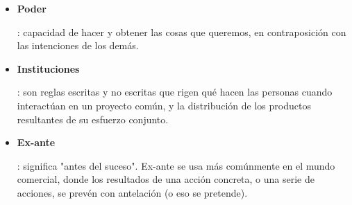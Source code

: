 \begin{itemize}
    \item \hypertarget{poder}{\textbf{Poder}}: capacidad de hacer y obtener las cosas que queremos, en contraposición con las intenciones de los demás.
    
    \item \hypertarget{instituciones}{\textbf{Instituciones}}: son reglas escritas y no escritas que rigen qué hacen las personas cuando interactúan en un proyecto común, y la distribución de los productos resultantes de su esfuerzo conjunto.
    
    \item \hypertarget{ex-ante}{\textbf{Ex-ante}}: significa "antes del suceso". Ex-ante se usa más comúnmente en el mundo comercial, donde los resultados de una acción concreta, o una serie de acciones, se prevén con antelación (o eso se pretende).
    
\end{itemize}

\newpage